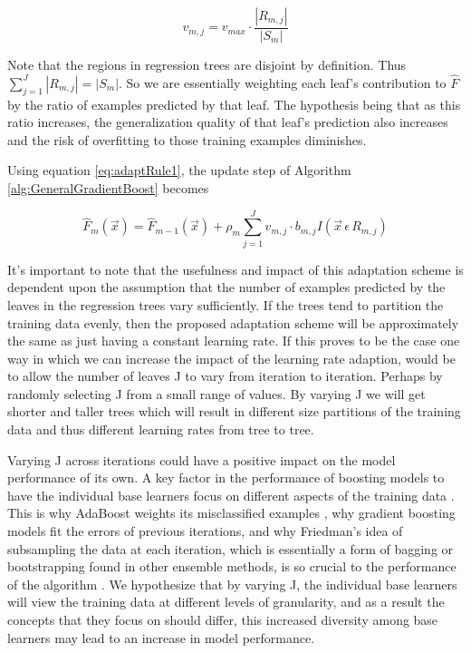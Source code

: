 \documentclass[runningheads]{llncs}
\begin{document}
{\begin{equation}
v_{m,j} = v_{max}  \cdot  \frac{|R_{m,j}|}{|S_m|}
\label{eq:adaptRule1}
\end{equation}

Note that the regions in regression trees are disjoint by definition. Thus  \(\sum_{j=1}^{J}|R_{m,j}| = |S_m|\). So we are essentially weighting each leaf's contribution to \(\hat{F}\) by the ratio of examples predicted by that leaf. The hypothesis being that as this ratio increases, the generalization quality of that leaf's prediction also increases and the risk of overfitting to those training examples diminishes.

Using equation \ref{eq:adaptRule1}, the update step of Algorithm \ref{alg:GeneralGradientBoost} becomes

	\begin{equation}
	\hat{F}_m(\vec{x}) = \hat{F}_{m-1}(\vec{x}) + \rho_m\sum_{j=1}^{J}v_{m,j}  \cdot  b_{m,j}I(\vec{x} \, \epsilon \, R_{m,j})
	\label{eq:revisedUpdateStep}
	\end{equation}

It's important to note that the usefulness and impact of this adaptation scheme is dependent upon the assumption that the number of examples predicted by the leaves in the regression trees vary sufficiently. If the trees tend to partition the training data evenly, then the proposed adaptation scheme will be approximately the same as just having a constant learning rate. If this proves to be the case one way in which we can increase the impact of the learning rate adaption, would be to allow the number of leaves J to vary from iteration to iteration. Perhaps by randomly selecting J from a small range of values. By varying J we will get shorter and taller trees which will result in different size partitions of the training data and thus different learning rates from tree to tree.

Varying J across iterations could have a positive impact on the model performance of its own. A key factor in the performance of boosting models to have the individual base learners focus on different aspects of the training data \cite{2002Friedman}. This is why AdaBoost weights its misclassified examples \cite{adaboost}, why gradient boosting models fit the errors of previous iterations, and why Friedman's idea of subsampling the data at each iteration, which is essentially a form of bagging or bootstrapping found in other ensemble methods, is so crucial to the performance of the algorithm \cite{2002Friedman}.  We hypothesize that by varying J, the individual base learners will view the training data at different levels of granularity, and as a result the concepts that they focus on should differ, this increased diversity among base learners may lead to an increase in model performance.

}
\end{document}
